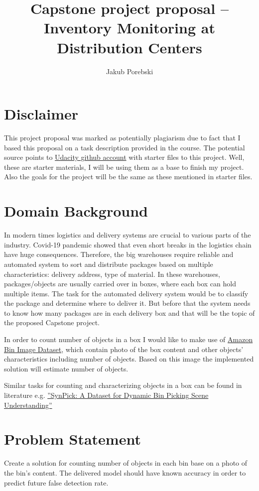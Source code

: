 \documentclass{article}
\title{Capstone project proposal -- Inventory Monitoring at Distribution Centers}
\author{Jakub Porebski}
\begin{document}
	\maketitle
	
\section*{Disclaimer}
This project proposal was marked as potentially plagiarism due to fact that I based this proposal on a task description provided in the course. The potential source points to \href{https://github.com/udacity/nd009t-capstone-starter}{Udacity github account} with starter files to this project. Well, these are starter materials, I will be using them as a base to finish my project. Also the goals for the project will be the same as these mentioned in starter files. 

\section{Domain Background}
In modern times logistics and delivery systems are crucial to various parts of the industry. Covid-19 pandemic showed that even short breaks in the logistics chain have huge consequences. Therefore, the big warehouses require reliable and automated system to sort and distribute packages based on multiple characteristics: delivery address, type of material. In these warehouses, packages/objects are usually carried over in boxes, where each box can hold multiple items. The task for the automated delivery system would be to classify the package and determine where to deliver it. But before that the system needs to know how many packages are in each delivery box and that will be the topic of the proposed Capstone project.

In order to count number of objects in a box I would like to make use of \href{https://registry.opendata.aws/amazon-bin-imagery/}{Amazon Bin Image Dataset}, which contain photo of the box content and other objects' characteristics including number of objects. Based on this image the implemented solution will estimate number of objects. 

Similar tasks for counting and characterizing objects in a box can be found in literature e.g. \href{https://arxiv.org/pdf/2107.04852.pdf}{''SynPick: A Dataset for Dynamic Bin Picking Scene Understanding''}

\section{Problem Statement}
Create a solution for counting number of objects in each bin base on a photo of the bin’s content. The delivered model should have known accuracy in order to predict future false detection rate.
\end{document}
